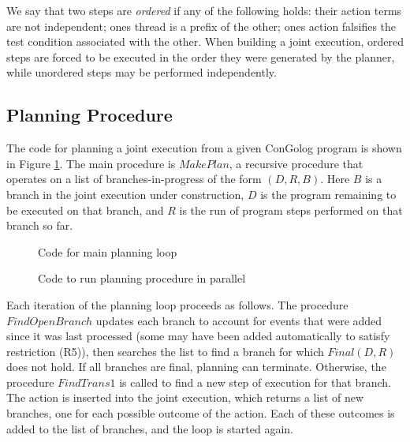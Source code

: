 We say that two steps are \emph{ordered} if any of the following holds:
their action terms are not independent; ones thread is a prefix of
the other; ones action falsifies the test condition associated with
the other. When building a joint execution, ordered steps are forced
to be executed in the order they were generated by the planner, while
unordered steps may be performed independently.


\subsection{Planning Procedure}

The code for planning a joint execution from a given ConGolog program
is shown in Figure \ref{fig:planning-code}. The main procedure is
$MakePlan$, a recursive procedure that operates on a list of branches-in-progress
of the form $(D,R,B)$. Here $B$ is a branch in the joint execution
under construction, $D$ is the program remaining to be executed on
that branch, and $R$ is the run of program steps performed on that
branch so far.

%
\begin{figure}

\caption{ Code for main planning loop }


\label{fig:planning-code} 
\end{figure}


%
\begin{figure}

\caption{ Code to run planning procedure in parallel }


\label{fig:parallel-search} 
\end{figure}


Each iteration of the planning loop proceeds as follows. The procedure
$FindOpenBranch$ updates each branch to account for events that were
added since it was last processed (some may have been added automatically
to satisfy restriction (R5)), then searches the list to find a branch
for which $Final(D,R)$ does not hold. If all branches are final,
planning can terminate. Otherwise, the procedure $FindTrans1$ is
called to find a new step of execution for that branch. The action
is inserted into the joint execution, which returns a list of new
branches, one for each possible outcome of the action. Each of these
outcomes is added to the list of branches, and the loop is started
again.

